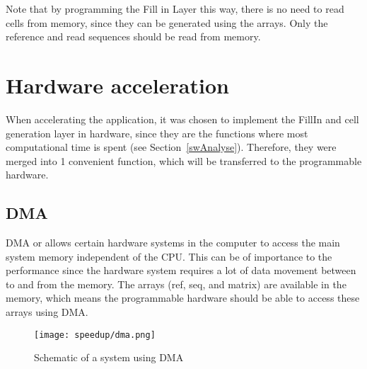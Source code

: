 Note that by programming the Fill in Layer this way, there is no need to read cells from memory, since they can be generated using the arrays. Only the reference and read sequences should be read from memory. 

\section{Hardware acceleration}

When accelerating the application, it was chosen to implement the FillIn and cell generation layer in hardware, since they are the functions where most computational time is spent (see Section~\ref{swAnalyse}). Therefore, they were merged into 1 convenient function, which will be transferred to the programmable hardware. 

\subsection{DMA}

DMA or  allows certain hardware systems in the computer to access the main system memory independent of the CPU. This can be of importance to the performance since the hardware system requires a lot of data movement between to and from the memory. The arrays (ref, seq, and matrix) are available in the memory, which means the programmable hardware should be able to access these arrays using DMA. 

\begin{figure}[H]
	\centering
	\texttt{[image: speedup/dma.png]}
	\caption{Schematic of a system using DMA}
	\label{fig:DMA}
\end{figure}


